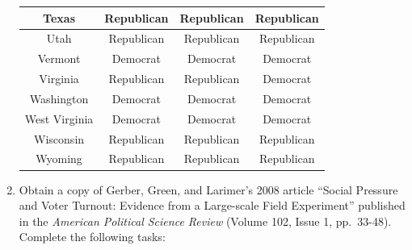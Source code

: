 \documentclass[]{book}
\theoremstyle{definition}
\theoremstyle{definition}
\theoremstyle{definition}
\theoremstyle{remark}
\begin{document}
\begin{enumerate}
\begin{table}
\begin{tabular}[t]{c|c|c|c}
  \hline
  Texas & Republican & Republican & Republican\\
  \hline
  Utah & Republican & Republican & Republican\\
  \hline
  Vermont & Democrat & Democrat & Democrat\\
  \hline
  Virginia & Republican & Republican & Democrat\\
  \hline
  Washington & Democrat & Democrat & Democrat\\
  \hline
  West Virginia & Democrat & Democrat & Democrat\\
  \hline
  Wisconsin & Republican & Republican & Republican\\
  \hline
  Wyoming & Republican & Republican & Republican\\
  \hline
  \end{tabular}
  \end{table}

\item
  Obtain a copy of Gerber, Green, and Larimer's 2008 article ``Social
  Pressure and Voter Turnout: Evidence from a Large-scale Field
  Experiment'' published in the \emph{American Political Science Review}
  (Volume 102, Issue 1, pp.~33-48). Complete the following tasks:


\end{enumerate}
\end{document}
